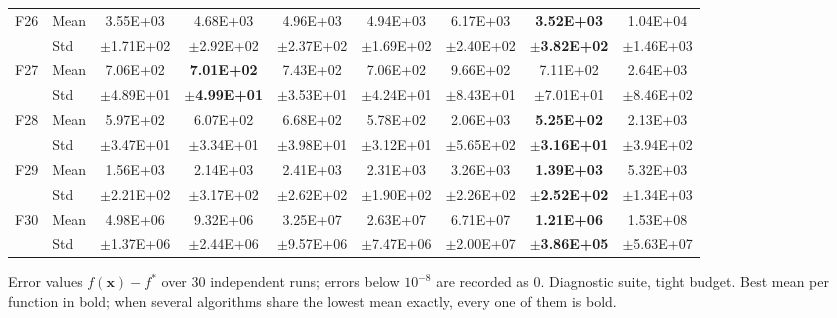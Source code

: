 \begin{table}[htbp]
{\begin{tabular}{clccccccc}
F26 & Mean & 3.55E+03 & 4.68E+03 & 4.96E+03 & 4.94E+03 & 6.17E+03 & \textbf{3.52E+03} & 1.04E+04 \\
 & Std & $\pm$1.71E+02 & $\pm$2.92E+02 & $\pm$2.37E+02 & $\pm$1.69E+02 & $\pm$2.40E+02 & $\pm$\textbf{3.82E+02} & $\pm$1.46E+03 \\
F27 & Mean & 7.06E+02 & \textbf{7.01E+02} & 7.43E+02 & 7.06E+02 & 9.66E+02 & 7.11E+02 & 2.64E+03 \\
 & Std & $\pm$4.89E+01 & $\pm$\textbf{4.99E+01} & $\pm$3.53E+01 & $\pm$4.24E+01 & $\pm$8.43E+01 & $\pm$7.01E+01 & $\pm$8.46E+02 \\
F28 & Mean & 5.97E+02 & 6.07E+02 & 6.68E+02 & 5.78E+02 & 2.06E+03 & \textbf{5.25E+02} & 2.13E+03 \\
 & Std & $\pm$3.47E+01 & $\pm$3.34E+01 & $\pm$3.98E+01 & $\pm$3.12E+01 & $\pm$5.65E+02 & $\pm$\textbf{3.16E+01} & $\pm$3.94E+02 \\
F29 & Mean & 1.56E+03 & 2.14E+03 & 2.41E+03 & 2.31E+03 & 3.26E+03 & \textbf{1.39E+03} & 5.32E+03 \\
 & Std & $\pm$2.21E+02 & $\pm$3.17E+02 & $\pm$2.62E+02 & $\pm$1.90E+02 & $\pm$2.26E+02 & $\pm$\textbf{2.52E+02} & $\pm$1.34E+03 \\
F30 & Mean & 4.98E+06 & 9.32E+06 & 3.25E+07 & 2.63E+07 & 6.71E+07 & \textbf{1.21E+06} & 1.53E+08 \\
 & Std & $\pm$1.37E+06 & $\pm$2.44E+06 & $\pm$9.57E+06 & $\pm$7.47E+06 & $\pm$2.00E+07 & $\pm$\textbf{3.86E+05} & $\pm$5.63E+07 \\
\bottomrule
\end{tabular}}
\begin{flushleft}\footnotesize
Error values $f(\mathbf{x})-f^{*}$ over 30 independent runs; errors below $10^{-8}$ are recorded as 0. Diagnostic suite, tight budget. Best mean per function in bold; when several algorithms share the lowest mean exactly, every one of them is bold.
\end{flushleft}
\end{table}
